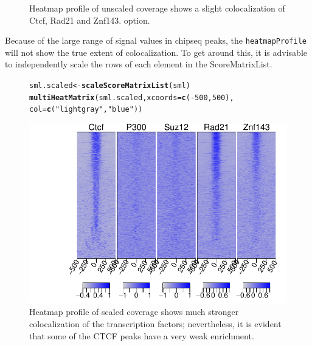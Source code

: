\documentclass{article}\usepackage[]{graphicx}\usepackage[]{color}
\makeatletter
\def\maxwidth{ %
  \ifdim\Gin@nat@width>\linewidth
    \linewidth
  \else
    \Gin@nat@width
  \fi
}
\newcommand{\hlnum}[1]{\textcolor[rgb]{0.686,0.059,0.569}{#1}}%
\newcommand{\hlstr}[1]{\textcolor[rgb]{0.192,0.494,0.8}{#1}}%
\newcommand{\hlopt}[1]{\textcolor[rgb]{0,0,0}{#1}}%
\newcommand{\hlstd}[1]{\textcolor[rgb]{0.345,0.345,0.345}{#1}}%
\newcommand{\hlkwb}[1]{\textcolor[rgb]{0.69,0.353,0.396}{#1}}%
\newcommand{\hlkwc}[1]{\textcolor[rgb]{0.333,0.667,0.333}{#1}}%
\newcommand{\hlkwd}[1]{\textcolor[rgb]{0.737,0.353,0.396}{\textbf{#1}}}%
\newenvironment{kframe}{%
 \def\at@end@of@kframe{}%
 \ifinner\ifhmode%
  \def\at@end@of@kframe{\end{minipage}}%
  \begin{minipage}{\columnwidth}%
 \fi\fi%
 \def\FrameCommand##1{\hskip\@totalleftmargin \hskip-\fboxsep
 \colorbox{shadecolor}{##1}\hskip-\fboxsep
     \hskip-\linewidth \hskip-\@totalleftmargin \hskip\columnwidth}%
 \MakeFramed {\advance\hsize-\width
   \@totalleftmargin\z@ \linewidth\hsize
   \@setminipage}}%
 {\par\unskip\endMakeFramed%
 \at@end@of@kframe}
\newenvironment{knitrout}{}{} %
\newcommand{\Rcode}[1]{{\texttt{#1}}}
\makeatother
\begin{document}
\begin{figure}
\begin{knitrout}
{}



\end{knitrout}

\caption{Heatmap profile of unscaled coverage shows a slight colocalization of
Ctcf, Rad21 and Znf143. option.\label{fig:ctcfScoreMatrixList}}
\end{figure}

Because of the large range of signal values in chipseq peaks, the \Rcode{heatmapProfile} 
will not show the true extent of colocalization. To get around this, it is advisable
to independently scale the rows of each element in the ScoreMatrixList.

\begin{figure}
\begin{knitrout}
\color{fgcolor}\begin{kframe}
\begin{alltt}
\hlstd{sml.scaled} \hlkwb{<-} \hlkwd{scaleScoreMatrixList}\hlstd{(sml)}
\hlkwd{multiHeatMatrix}\hlstd{(sml.scaled,} \hlkwc{xcoords} \hlstd{=} \hlkwd{c}\hlstd{(}\hlopt{-}\hlnum{500}\hlstd{,} \hlnum{500}\hlstd{),}
    \hlkwc{col} \hlstd{=} \hlkwd{c}\hlstd{(}\hlstr{"lightgray"}\hlstd{,} \hlstr{"blue"}\hlstd{))}
\end{alltt}
\end{kframe}

{\centering \includegraphics[width=\maxwidth]{FiguresplotScaledProfile} 

}



\end{knitrout}

\caption{Heatmap profile of scaled coverage shows much stronger colocalization 
of the transcription factors; nevertheless, it is evident that some of the CTCF 
peaks have a very weak enrichment.\label{fig:plotScaledProfile}}
\end{figure}
\end{document}
